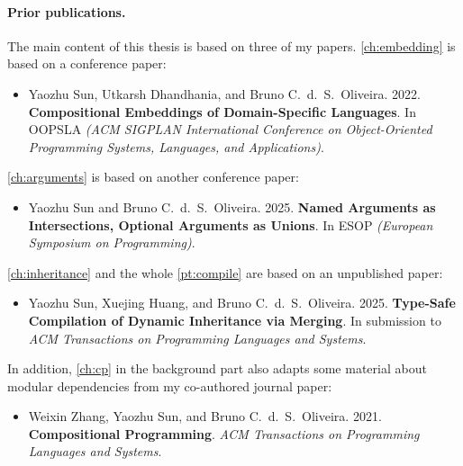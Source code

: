 \paragraph{Prior publications.}
The main content of this thesis is based on three of my papers.
\autoref{ch:embedding} is based on a conference paper:
\begin{itemize}
\item Yaozhu Sun, Utkarsh Dhandhania, and Bruno C.~d.~S.~Oliveira. 2022.
\textbf{Compositional Embeddings of Domain-Specific Languages}. In OOPSLA
\textit{(ACM SIGPLAN International Conference on Object-Oriented Programming
Systems, Languages, and Applications)}.
\end{itemize}
\autoref{ch:arguments} is based on another conference paper:
\begin{itemize}
\item Yaozhu Sun and Bruno C.~d.~S.~Oliveira. 2025.
\textbf{Named Arguments as Intersections, Optional Arguments as Unions}.
In ESOP \textit{(European Symposium on Programming)}.
\end{itemize}
\autoref{ch:inheritance} and the whole \autoref{pt:compile} are based on an
unpublished paper:
\begin{itemize}
\item Yaozhu Sun, Xuejing Huang, and Bruno C.~d.~S.~Oliveira. 2025.
\textbf{Type-Safe Compilation of Dynamic Inheritance via Merging}.
In submission to \textit{ACM Transactions on Programming Languages and Systems}.
\end{itemize}
In addition, \autoref{ch:cp} in the background part also adapts some material
about modular dependencies from my co-authored journal paper:
\begin{itemize}
\item Weixin Zhang, Yaozhu Sun, and Bruno C.~d.~S.~Oliveira. 2021.
\textbf{Compositional Programming}. \textit{ACM Transactions on Programming
Languages and Systems}.
\end{itemize}
